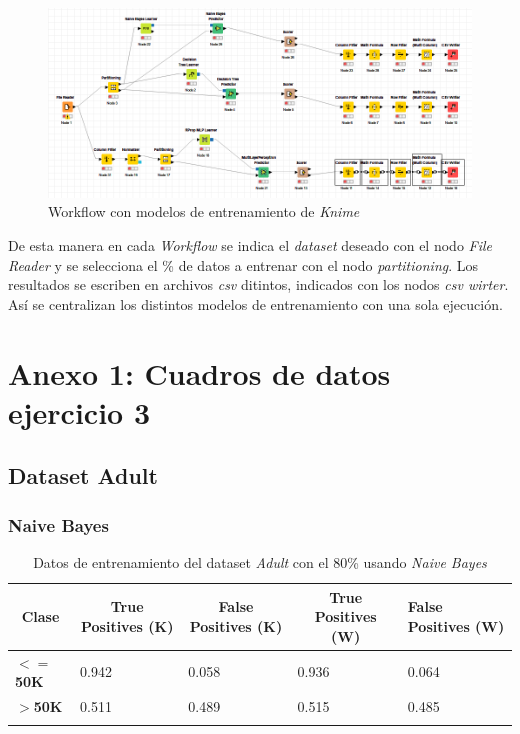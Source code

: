 \documentclass[10pt,a4paper]{article}
\begin{document}
\begin{figure}[h!]
	\centering
	\includegraphics[scale=0.5]{images/workflow_knime.png}
	\caption{Workflow con modelos de entrenamiento de \textit{Knime}}
	\label{fig:workflow_knime}
\end{figure}
De esta manera en cada \textit{Workflow} se indica el \textit{dataset} deseado con el nodo \textit{File Reader} y se selecciona el \% de datos a entrenar con el nodo \textit{partitioning}. Los resultados se escriben en archivos \textit{csv} ditintos, indicados con los nodos \textit{csv wirter}. Así se centralizan los distintos modelos de entrenamiento con una sola ejecución.
\newpage
\section{Anexo 1: Cuadros de datos ejercicio 3}

\subsection{Dataset Adult}

\subsubsection{Naive Bayes}
\begin{table}[h]
\begin{tabular}{lllll}
\hline
\multicolumn{1}{|c|}{\textbf{Clase}} & \multicolumn{1}{c|}{\textbf{True Positives (K)}} & \multicolumn{1}{c|}{\textbf{False Positives (K)}} & \multicolumn{1}{c|}{\textbf{True Positives (W)}} & \multicolumn{1}{l|}{\textbf{False Positives (W)}} \\ \hline
\multicolumn{1}{|l|}{\textbf{$<=$50K}} & \multicolumn{1}{l|}{0.942}          & \multicolumn{1}{l|}{0.058}          & \multicolumn{1}{l|}{0.936}          & \multicolumn{1}{l|}{0.064} \\ \hline
\multicolumn{1}{|l|}{\textbf{$>$50K}} & \multicolumn{1}{l|}{0.511}          & \multicolumn{1}{l|}{0.489}          & \multicolumn{1}{l|}{0.515}          & \multicolumn{1}{l|}{0.485} \\ \hline
\textbf{}                       &                                &                                &                                &                      
\end{tabular}
\caption{Datos de entrenamiento del dataset \emph{Adult} con el 80\% usando \emph{Naive Bayes}}
\label{tab:adult_bayes_80}
\end{table}
\end{document}
